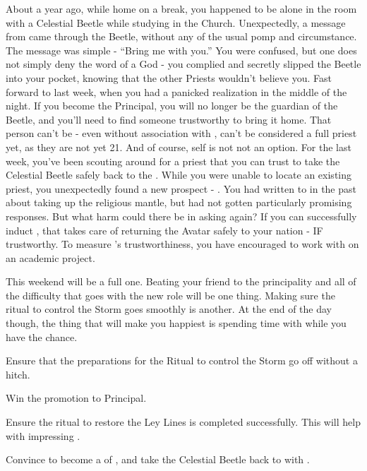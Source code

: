 \documentclass[char]{GL2020}
\begin{document}
About a year ago, while home on a break, you happened to be alone in the room with a Celestial Beetle while studying in the Church. Unexpectedly, a message from \cTechGod{} came through the Beetle, without any of the usual pomp and circumstance. The message was simple - “Bring me with you.” You were confused, but one does not simply deny the word of a God - you complied and secretly slipped the Beetle into your pocket, knowing that the other Priests wouldn’t believe you. Fast forward to last week, when you had a panicked realization in the middle of the night. If you become the Principal, you will no longer be the guardian of the Beetle, and you’ll need to find someone trustworthy to bring it home. That person can’t be \cScholarship{} - even without \cScholarship{\their} association with \cAntiChup{}, \cScholarship{\they} can’t be considered a full priest yet, as they are not yet 21. And of course, \cAntiChup{} \cAntiChup{\them}self is not not an option. For the last week, you’ve been scouting around for a priest that you can trust to take the Celestial Beetle safely back to the \pTech{}. While you were unable to locate an existing priest, you unexpectedly found a new prospect - \cHeadScientist{}. You had written to \cHeadScientist{} in the past about taking up the religious mantle, but had not gotten particularly promising responses. But what harm could there be in asking again? If you can successfully induct \cHeadScientist{}, that takes care of returning the Avatar safely to your nation - IF \cHeadScientist{\theyare} trustworthy. To measure \cHeadScientist{}’s trustworthiness, you have encouraged \cHeadScientist{\them} to work with \cEbbPriest{} on an academic project.

This weekend will be a full one. Beating your friend \cMusic{} to the principality and all of the difficulty that goes with the new role will be one thing. Making sure the ritual to control the Storm goes smoothly is another.  At the end of the day though, the thing that will make you happiest is spending time with \cJuniorStatesman{} while you have the chance. 




\begin{itemz}[Goals]
	\item Ensure that the preparations for the Ritual to control the Storm go off without a hitch.
	\item Win the promotion to Principal.
\item Ensure the ritual to restore the Ley Lines is completed successfully. This will help with impressing \cPrincipal{}.
\item Convince \cHeadScientist{} to become a \cHeadScientist{\clergy} of \cTechGod{}, and take the Celestial Beetle back to \pTech{} with \cHeadScientist{\them}.
\end{itemz}
\end{document}
